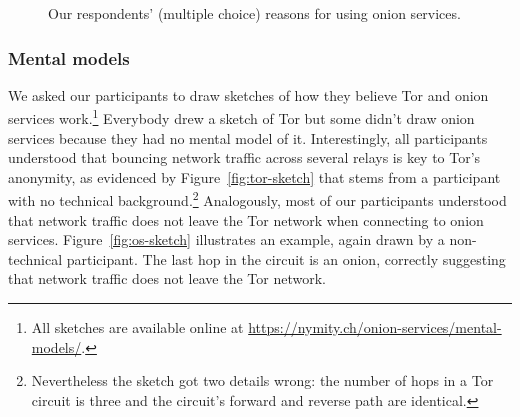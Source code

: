 \begin{figure}[t]
    \centering
    
    \caption{Our respondents' (multiple choice) reasons for using onion
    services.}
    \label{fig:onion-usage}
\end{figure}

\subsubsection{Mental models}

We asked our participants to draw sketches of how they believe Tor and onion
services work.\footnote{All sketches are available online at
\url{https://nymity.ch/onion-services/mental-models/}.}   Everybody drew a
sketch of Tor but some didn't draw onion services because they had no mental
model of it.  Interestingly, all participants understood that bouncing network
traffic across several relays is key to Tor's anonymity, as evidenced by
Figure~\ref{fig:tor-sketch} that stems from a participant with no technical
background.\footnote{Nevertheless the sketch got two details wrong: the number
of hops in a Tor circuit is three and the circuit's forward and reverse path are
identical.}  Analogously, most of our participants understood that network
traffic does not leave the Tor network when connecting to onion services.
Figure~\ref{fig:os-sketch} illustrates an example, again drawn by a
non-technical participant.  The last hop in the circuit is an onion, correctly
suggesting that network traffic does not leave the Tor network.

